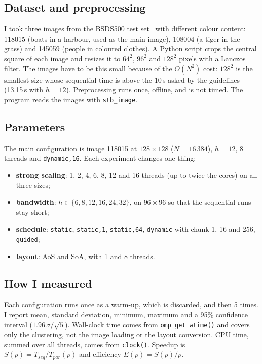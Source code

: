 \documentclass[10pt,twocolumn,letterpaper]{article}
\newcommand{\x}{\ensuremath{\times}}
\begin{document}
\subsection{Dataset and preprocessing}
I took three images from the BSDS500 test set~\cite{arbelaez2011} with different colour content:
118015 (boats in a harbour, used as the main image), 108004 (a tiger in the grass) and 145059
(people in coloured clothes). A Python script crops the central square of each image and resizes it
to $64^2$, $96^2$ and $128^2$ pixels with a Lanczos filter. The images have to be this small
because of the $O(N^2)$ cost: $128^2$ is the smallest size whose sequential time is above the 10\,s
asked by the guidelines (13.15\,s with $h=12$). Preprocessing runs once, offline, and is not timed.
The program reads the images with \texttt{stb\_image}.

\subsection{Parameters}
The main configuration is image 118015 at $128\x128$ ($N = 16\,384$), $h = 12$, 8 threads and
\texttt{dynamic,16}. Each experiment changes one thing:
\begin{itemize}
    \item \textbf{strong scaling}: 1, 2, 4, 6, 8, 12 and 16 threads (up to twice the cores) on all
    three sizes;
    \item \textbf{bandwidth}: $h \in \{6, 8, 12, 16, 24, 32\}$, on $96\x96$ so that the sequential
    runs stay short;
    \item \textbf{schedule}: \texttt{static}, \texttt{static,1}, \texttt{static,64},
    \texttt{dynamic} with chunk 1, 16 and 256, \texttt{guided};
    \item \textbf{layout}: AoS and SoA, with 1 and 8 threads.
\end{itemize}

\subsection{How I measured}
Each configuration runs once as a warm-up, which is discarded, and then 5 times. I report mean,
standard deviation, minimum, maximum and a 95\% confidence interval ($1.96\,\sigma/\sqrt{5}$).
Wall-clock time comes from \texttt{omp\_get\_wtime()} and covers only the clustering, not the image
loading or the layout conversion. CPU time, summed over all threads, comes from
\texttt{clock()}. Speedup is $S(p) = T_{seq}/T_{par}(p)$ and efficiency $E(p) = S(p)/p$.
\end{document}

